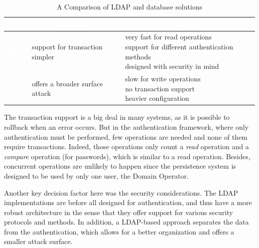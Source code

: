 \begin{table}[h]
	\caption{A Comparison of LDAP and database solutions}
	\centering
	\label{tab:ldap_db}
	\begin{tabular}{|c|l|l|}
		\cline{2-3}
		\multicolumn{1}{c|}{} & 
		\multicolumn{1}{|c|}{\cellcolor{Gray}\textcolor{white}{\textbf{Database}}} & 
		\multicolumn{1}{|c|}{\cellcolor{Gray}\textcolor{white}{\textbf{LDAP}}} \\
		\hline
		\cellcolor{Gray}\textcolor{white}{\textbf{Plus}} &
		\pbox{0.4\linewidth}{
			\vspace{0.5em}
			\textbullet \quad support for transaction \\
			\textbullet \quad simpler
		} & 
		\pbox{0.4\linewidth}{
			\vspace{0.5em}
			\textbullet \quad very fast for read operations \\
			\textbullet \quad support for different authentication methods \\
			\textbullet \quad designed with security in mind
		} \\
		\hline
		\cellcolor{Gray}\textcolor{white}{\textbf{Cons}} &
		\pbox{0.4\linewidth}{
			\vspace{0.5em}
			\textbullet \quad offers a broader surface attack \\
		} & 
		\pbox{0.4\linewidth}{
			\vspace{0.5em}
			\textbullet \quad slow for write operations \\
			\textbullet \quad no transaction support \\
			\textbullet \quad heavier configuration
		} \\
		\hline
	\end{tabular}
\end{table}

The transaction support is a big deal in many systems, as it is possible to rollback when an error occurs. But in the authentication framework, where only authentication must be performed, few operations are needed and none of them require transactions. Indeed, those operations only count a \textit{read} operation and a \textit{compare} operation (for passwords), which is similar to a read operation. Besides, concurrent operations are unlikely to happen since the persistence system is designed to be used by only one user, the Domain Operator.

Another key decision factor here was the security considerations. The LDAP implementations are before all designed for authentication, and thus have a more robust architecture in the sense that they offer support for various security protocols and methods. In addition, a LDAP-based approach separates the data from the authentication, which allows for a better organization and offers a smaller attack surface.

